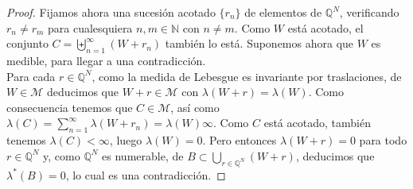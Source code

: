 \documentclass[a4paper, 12pt]{article}
\begin{document}
\begin{enumerate}[label=\textbf{\arabic*}.]
\begin{proof}
	Fijamos ahora una sucesión acotado \(\{r_n\}\) de elementos de \(\mathbb{Q}^N\), verificando \(r_n \neq r_m\) para cualesquiera \(n, m \in \mathbb{N}\) con \(n \neq m\). Como \(W\) está acotado, el conjunto \(C = \biguplus_{n=1}^{\infty} (W + r_n)\) también lo está. Suponemos ahora que \(W\) es medible, para llegar a una contradicción. \\
	
	Para cada \(r \in \mathbb{Q}^N\), como la medida de Lebesgue es invariante por traslaciones, de \(W \in \mathcal{M}\) deducimos que \(W + r \in \mathcal{M}\) con \(\lambda (W+r) = \lambda(W)\). Como consecuencia tenemos que \(C \in \mathcal{M}\), así como \(\lambda(C) = \sum_{n=1}^{\infty} \lambda (W + r_n) = \lambda (W) \infty\). Como \(C\) está acotado, también tenemos \(\lambda (C) < \infty\), luego \(\lambda (W) = 0\). Pero entonces \(\lambda (W + r) = 0\) para todo \(r \in \mathbb{Q}^N\) y, como \(\mathbb{Q}^N\) es numerable, de \(B \subset \bigcup_{r \in \mathbb{Q}^N} (W + r)\), deducimos que \(\lambda^* (B) = 0\), lo cual es una contradicción.
	\end{proof}
	
\end{enumerate}
\end{document}
